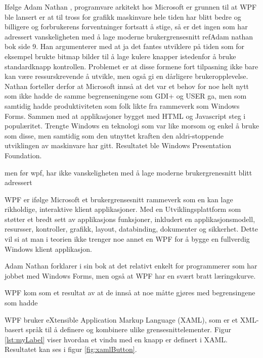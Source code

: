 Ifølge Adam Nathan \cite[p.~9]{WPFbook}, programvare arkitekt hos Microsoft er grunnen til at WPF ble lansert er at til tross for grafikk maskinvare hele tiden har blitt bedre og billigere og  forbrukerens forventninger fortsatt å stige, så er det ingen som har adressert vanskeligheten med å lage moderne brukergrensesnitt ref{Adam nathan bok side 9}.  Han argumenterer med at ja det fantes utviklere på tiden som for eksempel brukte bitmap bilder til å lage kulere knapper istedenfor å bruke standardknapp kontrollen. Problemet er at disse formene fort tilpasning ikke bare kan være ressurskrevende å utvikle, men også gi en dårligere brukeropplevelse. Nathan forteller derfor at Microsoft innså at det var et behov for noe helt nytt som ikke hadde de samme begrenseningene som GDI+ og USER ga, men som samtidig hadde produktiviteten som folk likte fra rammeverk som Windows Forms. Sammen med at applikasjoner bygget med HTML og Javascript steg i populæritet. Trengte Windows en teknologi som var like morsom og enkel å bruke som disse, men samtidig som den utnyttet kraften den aldri-stoppende utviklingen av maskinvare har gitt. Resultatet ble Windows Presentation Foundation.




men før wpf, har ikke vanskeligheten med å lage moderne brukergrenesnitt blitt adressert  

WPF er ifølge Microsoft \cite{Getti7:online} et brukergrensesnitt rammeverk som en kan lage rikholdige, interaktive klient applikasjoner. Med en Utviklingsplattform som støtter et bredt sett av applikasjons funksjoner, inkludert en applikasjonsmodell, resursser, kontroller, grafikk, layout, databinding, dokumenter og sikkerhet. Dette vil si at man i teorien ikke trenger noe annet en WPF for å bygge en fullverdig Windows klient applikasjon. 


Adam Nathan forklarer i sin bok at det relativt enkelt for programmerer som har jobbet med Windows Forms, men også at WPF har en svært bratt læringskurve. 

WPF kom som et resultat av at de innså at noe måtte gjøres med begrensingene som hadde 





 WPF bruker eXtensible Application Markup Language (\gls{XAML}), som er et XML-basert språk til å definere og kombinere ulike grensesnittelementer. Figur \ref{lst:myLabel} viser hvordan et vindu med en knapp er definert i XAML. Resultatet kan ses i figur \ref{fig:xamlButton}. 

